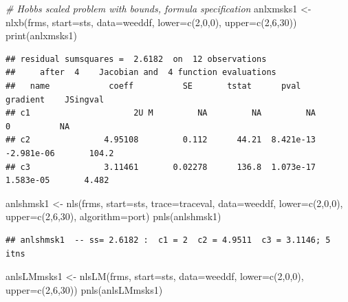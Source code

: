 \documentclass[
]{article}
\newenvironment{Shaded}{\begin{snugshade}}{\end{snugshade}}
\newcommand{\AttributeTok}[1]{\textcolor[rgb]{0.77,0.63,0.00}{#1}}
\newcommand{\CommentTok}[1]{\textcolor[rgb]{0.56,0.35,0.01}{\textit{#1}}}
\newcommand{\DecValTok}[1]{\textcolor[rgb]{0.00,0.00,0.81}{#1}}
\newcommand{\FunctionTok}[1]{\textcolor[rgb]{0.00,0.00,0.00}{#1}}
\newcommand{\NormalTok}[1]{#1}
\newcommand{\OtherTok}[1]{\textcolor[rgb]{0.56,0.35,0.01}{#1}}
\newcommand{\StringTok}[1]{\textcolor[rgb]{0.31,0.60,0.02}{#1}}
\begin{document}
\begin{Shaded}
\begin{Highlighting}[]
\CommentTok{\# Hobbs scaled problem with bounds, formula specification}
\NormalTok{anlxmsks1 }\OtherTok{\textless{}{-}} \FunctionTok{nlxb}\NormalTok{(frms, }\AttributeTok{start=}\NormalTok{sts, }\AttributeTok{data=}\NormalTok{weeddf, }\AttributeTok{lower=}\FunctionTok{c}\NormalTok{(}\DecValTok{2}\NormalTok{,}\DecValTok{0}\NormalTok{,}\DecValTok{0}\NormalTok{),}
                  \AttributeTok{upper=}\FunctionTok{c}\NormalTok{(}\DecValTok{2}\NormalTok{,}\DecValTok{6}\NormalTok{,}\DecValTok{30}\NormalTok{))}
\FunctionTok{print}\NormalTok{(anlxmsks1)}
\end{Highlighting}
\end{Shaded}

\begin{verbatim}
## residual sumsquares =  2.6182  on  12 observations
##     after  4    Jacobian and  4 function evaluations
##   name            coeff          SE       tstat      pval      gradient    JSingval   
## c1                     2U M         NA         NA         NA           0          NA  
## c2               4.95108         0.112      44.21  8.421e-13  -2.981e-06       104.2  
## c3               3.11461       0.02278      136.8  1.073e-17   1.583e-05       4.482
\end{verbatim}

\begin{Shaded}
\begin{Highlighting}[]
\NormalTok{anlshmsk1 }\OtherTok{\textless{}{-}} \FunctionTok{nls}\NormalTok{(frms, }\AttributeTok{start=}\NormalTok{sts, }\AttributeTok{trace=}\NormalTok{traceval, }\AttributeTok{data=}\NormalTok{weeddf, }\AttributeTok{lower=}\FunctionTok{c}\NormalTok{(}\DecValTok{2}\NormalTok{,}\DecValTok{0}\NormalTok{,}\DecValTok{0}\NormalTok{),}
             \AttributeTok{upper=}\FunctionTok{c}\NormalTok{(}\DecValTok{2}\NormalTok{,}\DecValTok{6}\NormalTok{,}\DecValTok{30}\NormalTok{), }\AttributeTok{algorithm=}\StringTok{\textquotesingle{}port\textquotesingle{}}\NormalTok{)}
\FunctionTok{pnls}\NormalTok{(anlshmsk1)}
\end{Highlighting}
\end{Shaded}

\begin{verbatim}
## anlshmsk1  -- ss= 2.6182 :  c1 = 2  c2 = 4.9511  c3 = 3.1146; 5  itns
\end{verbatim}

\begin{Shaded}
\begin{Highlighting}[]
\NormalTok{anlsLMmsks1 }\OtherTok{\textless{}{-}} \FunctionTok{nlsLM}\NormalTok{(frms, }\AttributeTok{start=}\NormalTok{sts, }\AttributeTok{data=}\NormalTok{weeddf, }\AttributeTok{lower=}\FunctionTok{c}\NormalTok{(}\DecValTok{2}\NormalTok{,}\DecValTok{0}\NormalTok{,}\DecValTok{0}\NormalTok{),}
                 \AttributeTok{upper=}\FunctionTok{c}\NormalTok{(}\DecValTok{2}\NormalTok{,}\DecValTok{6}\NormalTok{,}\DecValTok{30}\NormalTok{))}
\FunctionTok{pnls}\NormalTok{(anlsLMmsks1)}
\end{Highlighting}
\end{Shaded}
\end{document}
